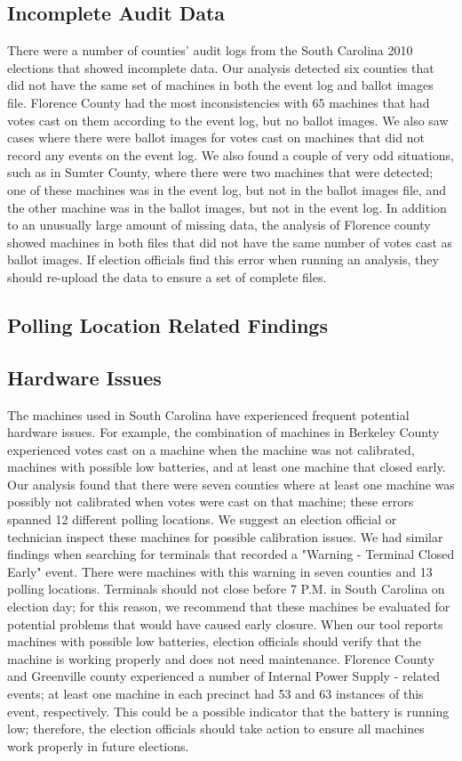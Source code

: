 \subsection{Incomplete Audit Data}
There were a number of counties' audit logs from the South Carolina 2010 elections that showed incomplete data.  Our analysis detected six counties that did not have the same set of machines in both the event log and ballot images file.  Florence County had the most inconsistencies with 65 machines that had votes cast on them according to the event log, but no ballot images.  We also saw cases where there were ballot images for votes cast on machines that did not record any events on the event log.  We also found a couple of very odd situations, such as in Sumter County, where there were two machines that were detected; one of these machines was in the event log, but not in the ballot images file, and the other machine was in the ballot images, but not in the event log.  In addition to an unusually large amount of missing data, the analysis of Florence county showed machines in both files that did not have the same number of votes cast as ballot images.  If election officials find this error when running an analysis,  they should re-upload the data to ensure a set of complete files.

\subsection{Polling Location Related Findings}

\subsection{Hardware Issues}
The machines used in South Carolina have experienced frequent potential hardware issues.  For example, the combination of machines in Berkeley County experienced votes cast on a machine when the machine was not calibrated, machines with possible low batteries, and at least one machine that closed early.  Our analysis found that there were seven counties where at least one machine was possibly not calibrated when votes were cast on that machine; these errors spanned 12 different polling locations.  We suggest an election official or technician inspect these machines for possible calibration issues.  We had similar findings when searching for terminals that recorded a "Warning - Terminal Closed Early" event.  There were machines with this warning in seven counties and 13 polling locations.  Terminals should not close before 7 P.M. in South Carolina on election day; for this reason, we recommend that these machines be evaluated for potential problems that would have caused early closure.  When our tool reports machines with possible low batteries, election officials should verify that the machine is working properly and does not need maintenance.  Florence County and Greenville county experienced a number of Internal Power Supply - related events; at least one machine in each precinct had 53 and 63 instances of this event, respectively.  This could be a possible indicator that the battery is running low; therefore, the election officials should take action to ensure all machines work properly in future elections.

